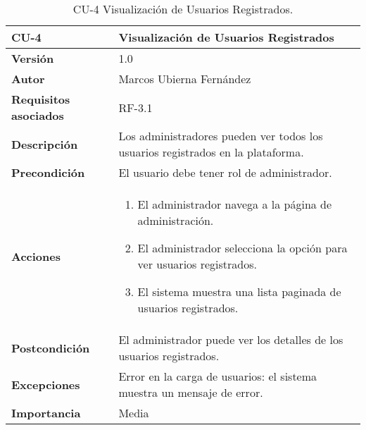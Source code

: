\begin{table}[p]
	\centering
	\begin{tabularx}{\linewidth}{ p{} p{} }
		\toprule
		\textbf{CU-4}    & \textbf{Visualización de Usuarios Registrados}\\
		\toprule
		\textbf{Versión}              & 1.0    \\
		\textbf{Autor}                & Marcos Ubierna Fernández \\
		\textbf{Requisitos asociados} & RF-3.1 \\
		\textbf{Descripción}          & Los administradores pueden ver todos los usuarios registrados en la plataforma. \\
		\textbf{Precondición}         & El usuario debe tener rol de administrador. \\
		\textbf{Acciones}             &
		\begin{enumerate}
			\def\labelenumi{\arabic{enumi}.}
			\tightlist
			\item El administrador navega a la página de administración.
			\item El administrador selecciona la opción para ver usuarios registrados.
                \item El sistema muestra una lista paginada de usuarios registrados.
		\end{enumerate}\\
		\textbf{Postcondición}        & El administrador puede ver los detalles de los usuarios registrados. \\
		\textbf{Excepciones}          & Error en la carga de usuarios: el sistema muestra un mensaje de error. \\
		\textbf{Importancia}          & Media \\
		\bottomrule
	\end{tabularx}
	\caption{CU-4 Visualización de Usuarios Registrados.}
\end{table}

